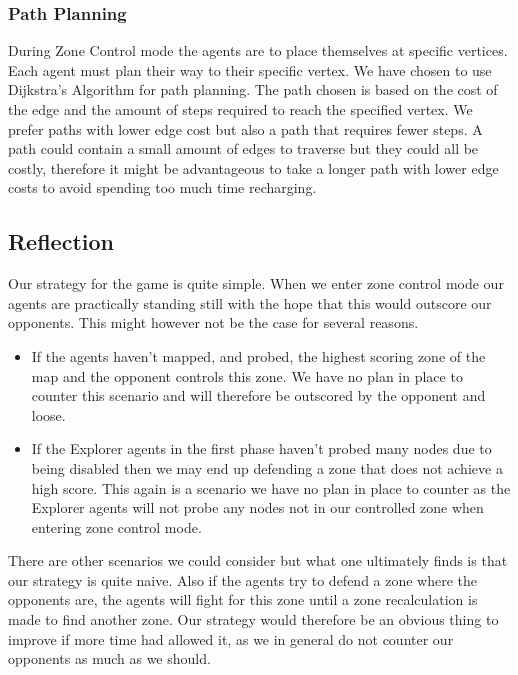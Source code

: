 \documentclass[11pt]{article}
\begin{document}
\subsubsection{Path Planning}
During Zone Control mode the agents are to place themselves at specific vertices. Each agent must plan their way to their specific vertex. We have chosen to use Dijkstra's Algorithm for path planning. The path chosen is based on the cost of the edge and the amount of steps required to reach the specified vertex. We prefer paths with lower edge cost but also a path that requires fewer steps. A path could contain a small amount of edges to traverse but they could all be costly, therefore it might be advantageous to take a longer path with lower edge costs to avoid spending too much time recharging. 

\subsection{Reflection}
Our strategy for the game is quite simple. When we enter zone control mode our agents are practically standing still with the hope that this would outscore our opponents. This might however not be the case for several reasons.

\begin{itemize}
	\item If the agents haven't mapped, and probed, the highest scoring zone of the map and the opponent controls this zone. We have no plan in place to counter this scenario and will therefore be outscored by the opponent and loose.
	
	\item If the Explorer agents in the first phase haven't probed many nodes due to being disabled then we may end up defending a zone that does not achieve a high score. This again is a scenario we have no plan in place to counter as the Explorer agents will not probe any nodes not in our controlled zone when entering zone control mode.
\end{itemize}

There are other scenarios we could consider but what one ultimately finds is that our strategy is quite naive. Also if the agents try to defend a zone where the opponents are, the agents will fight for this zone until a zone recalculation is made to find another zone. Our strategy would therefore be an obvious thing to improve if more time had allowed it, as we in general do not counter our opponents as much as we should.
\end{document}
